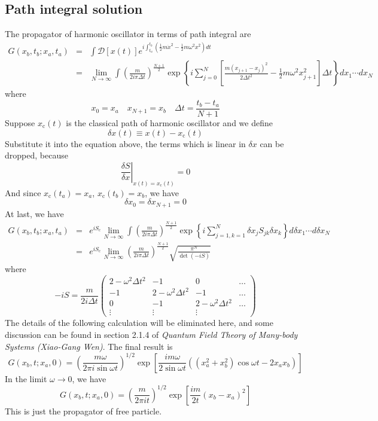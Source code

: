 \subsection{Path integral solution}
The propagator of harmonic oscillator in terms of path integral are
\begin{eqnarray}
G(x_b,t_b;x_a,t_a) &=& \int \mathcal{D}[x(t)] e^{i\int_{t_a}^{t_b} (\frac{1}{2}m\dot{x}^2 - \frac{1}{2}m\omega^2 x^2)dt} \nonumber \\
&=& \lim_{N \to \infty} \int \left(\frac{m}{2i\pi\Delta t}\right)^{\frac{N+1}{2}} \exp \left\{ i \sum_{j=0}^{N}\left[ \frac{m(x_{j+1}-x_{j})^2}{2\Delta t^2}   - \frac{1}{2}m\omega^2 x_{j+1}^2 \right] \Delta t \right\} dx_1 \cdots dx_N \nonumber
\end{eqnarray}
where
\[x_0 = x_a \quad x_{N+1} = x_b \quad \Delta t = \frac{t_b-t_a}{N+1}\]
Suppose $x_{\mathrm{c}}(t)$ is the classical path of harmonic oscillator and we define
\[\delta x(t) \equiv x(t) - x_{\mathrm{c}}(t)\]
Substitute it into the equation above, the terms which is linear in $\delta x$ can be dropped, because
\[\left. \frac{\delta S}{\delta x} \right|_{x(t) = x_{\mathrm{c}}(t)} = 0\]
And since $x_{\mathrm{c}}(t_a) = x_a$, $x_{\mathrm{c}}(t_b) = x_b$, we have
\[\delta x_{0} = \delta x_{N+1} = 0\]
At last, we have
\begin{eqnarray}
G(x_b,t_b;x_a,t_a) &=& e^{iS_{\mathrm{c}}} \lim_{N \to \infty} \int \left(\frac{m}{2i\pi\Delta t}\right)^{\frac{N+1}{2}} \exp \left\{ i \sum_{j=1,k=1}^{N} \delta x_j S_{jk} \delta x_k\right\} d\delta x_1 \cdots d\delta x_N \nonumber \\
&=& e^{iS_{\mathrm{c}}} \lim_{N \to \infty} \left(\frac{m}{2i\pi\Delta t}\right)^{\frac{N+1}{2}} \sqrt{\frac{\pi^N}{\det (-iS)}}
\end{eqnarray}
where
\[-iS = \frac{m}{2i\Delta t} \left( \begin{matrix} 2-\omega^2\Delta t^2 & -1& 0& \ldots \\ -1& 2-\omega^2\Delta t^2& -1& \ldots \\ 0& -1& 2-\omega^2\Delta t^2& \ldots \\ \vdots & \vdots & \vdots & \end{matrix} \right)\]
The details of the following calculation will be eliminated here, and some discussion can be found in section 2.1.4 of \emph{Quantum Field Theory of Many-body Systems (Xiao-Gang Wen)}. The final result is\\
\[G(x_b,t;x_a,0) = \left ( \frac{m\omega}{2\pi i \sin \omega t} \right )^{1/2}\exp \left [ \frac{im\omega}{2\sin\omega t} \left ((x_a^2 + x_b^2)\cos\omega t - 2x_a x_b  \right ) \right ]\]
In the limit $\omega \to 0$, we have
\[G(x_b,t;x_a,0) = \left ( \frac{m}{2\pi i t} \right )^{1/2}\exp \left [ \frac{im}{2t} \left ( x_b-x_a\right)^2 \right ]\]
This is just the propagator of free particle.

